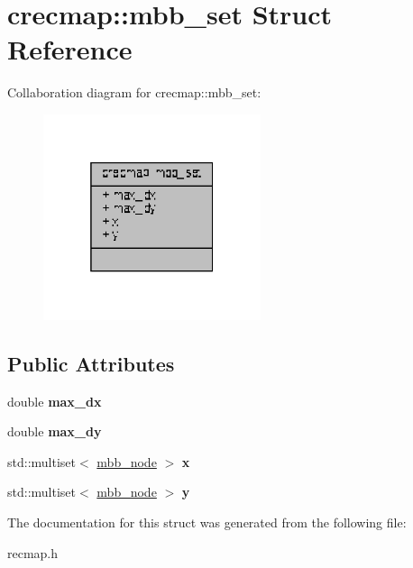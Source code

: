 \hypertarget{structcrecmap_1_1mbb__set}{}\section{crecmap\+:\+:mbb\+\_\+set Struct Reference}
\label{structcrecmap_1_1mbb__set}


Collaboration diagram for crecmap\+:\+:mbb\+\_\+set\+:\nopagebreak
\begin{figure}[H]
\begin{center}
\leavevmode
\includegraphics[width=181pt]{structcrecmap_1_1mbb__set__coll__graph}
\end{center}
\end{figure}
\subsection*{Public Attributes}
\begin{DoxyCompactItemize}
\item 
\mbox{\label{structcrecmap_1_1mbb__set_a1307ff6aec408999c6f348bb42efa150}} 
double {\bfseries max\+\_\+dx}
\item 
\mbox{\label{structcrecmap_1_1mbb__set_a501f690ba4cbd602aec52c72c8abae05}} 
double {\bfseries max\+\_\+dy}
\item 
\mbox{\label{structcrecmap_1_1mbb__set_a6dcb7bc9df15fd92ec6974cc876227de}} 
std\+::multiset$<$ \hyperlink{structcrecmap_1_1mbb__node}{mbb\+\_\+node} $>$ {\bfseries x}
\item 
\mbox{\label{structcrecmap_1_1mbb__set_a63688e8e02c3a13bf971ea06bd3b084c}} 
std\+::multiset$<$ \hyperlink{structcrecmap_1_1mbb__node}{mbb\+\_\+node} $>$ {\bfseries y}
\end{DoxyCompactItemize}


The documentation for this struct was generated from the following file\+:\begin{DoxyCompactItemize}
\item 
recmap.\+h\end{DoxyCompactItemize}
